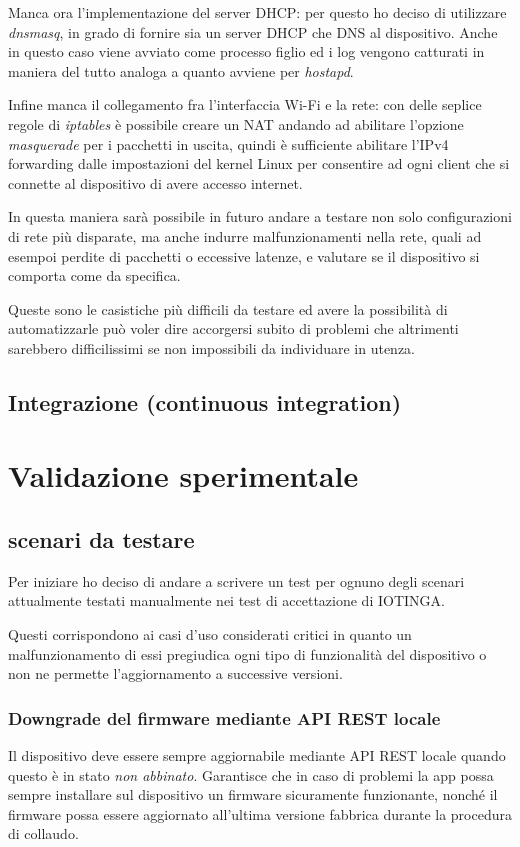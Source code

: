 \documentclass[a4paper,titlepage]{article}
\begin{document}
Manca ora l'implementazione del server DHCP: per questo ho deciso di utilizzare
\textit{dnsmasq}, in grado di fornire sia un server DHCP che DNS al dispositivo.
Anche in questo caso viene avviato come processo figlio ed i log vengono catturati
in maniera del tutto analoga a quanto avviene per \textit{hostapd}.

Infine manca il collegamento fra l'interfaccia Wi-Fi e la rete: con delle seplice
regole di \textit{iptables} è possibile creare un NAT andando ad abilitare l'opzione
\textit{masquerade} per i pacchetti in uscita, quindi è sufficiente abilitare l'IPv4
forwarding dalle impostazioni del kernel Linux per consentire ad ogni client che si
connette al dispositivo di avere accesso internet.

In questa maniera sarà possibile in futuro andare a testare non solo configurazioni
di rete più disparate, ma anche indurre malfunzionamenti nella rete, quali  ad esempoi
perdite di pacchetti o eccessive latenze, e valutare se il dispositivo si comporta come
da specifica.

Queste sono le casistiche più difficili da testare ed avere la possibilità di automatizzarle
può voler dire accorgersi subito di problemi che altrimenti sarebbero difficilissimi
se non impossibili da individuare in utenza.


\subsection{Integrazione (continuous integration)}

\section{Validazione sperimentale}



\subsection{scenari da testare}

Per iniziare ho deciso di andare a scrivere un test per ognuno degli scenari attualmente
testati manualmente nei test di accettazione di IOTINGA.

Questi corrispondono ai casi d'uso considerati critici in quanto un malfunzionamento
di essi pregiudica ogni tipo di funzionalità del dispositivo o non ne permette l'aggiornamento
a successive versioni.

\subsubsection{Downgrade del firmware mediante API REST locale}
Il dispositivo deve essere sempre aggiornabile mediante API REST locale quando questo
è in stato \textit{non abbinato}. Garantisce che in caso di problemi la app possa sempre
installare sul dispositivo un firmware sicuramente funzionante, nonché il firmware
possa essere aggiornato all’ultima versione fabbrica durante la procedura di collaudo.
\end{document}
